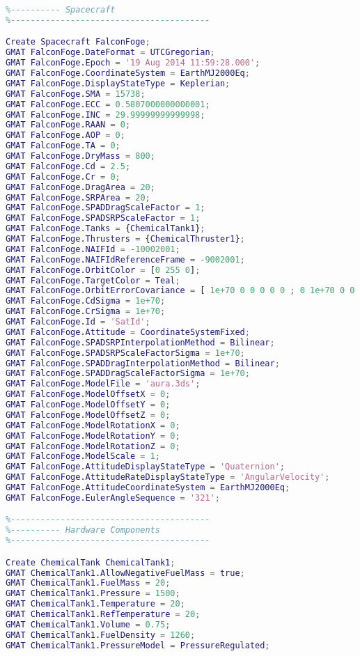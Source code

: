 \begin{lstlisting}[language=MATLAB, caption= Scrit de GMAT]
%----------------------------------------
%---------- Spacecraft
%----------------------------------------

Create Spacecraft FalconFoge;
GMAT FalconFoge.DateFormat = UTCGregorian;
GMAT FalconFoge.Epoch = '19 Aug 2014 11:59:28.000';
GMAT FalconFoge.CoordinateSystem = EarthMJ2000Eq;
GMAT FalconFoge.DisplayStateType = Keplerian;
GMAT FalconFoge.SMA = 15738;
GMAT FalconFoge.ECC = 0.5807000000000001;
GMAT FalconFoge.INC = 29.99999999999998;
GMAT FalconFoge.RAAN = 0;
GMAT FalconFoge.AOP = 0;
GMAT FalconFoge.TA = 0;
GMAT FalconFoge.DryMass = 800;
GMAT FalconFoge.Cd = 2.5;
GMAT FalconFoge.Cr = 0;
GMAT FalconFoge.DragArea = 20;
GMAT FalconFoge.SRPArea = 20;
GMAT FalconFoge.SPADDragScaleFactor = 1;
GMAT FalconFoge.SPADSRPScaleFactor = 1;
GMAT FalconFoge.Tanks = {ChemicalTank1};
GMAT FalconFoge.Thrusters = {ChemicalThruster1};
GMAT FalconFoge.NAIFId = -10002001;
GMAT FalconFoge.NAIFIdReferenceFrame = -9002001;
GMAT FalconFoge.OrbitColor = [0 255 0];
GMAT FalconFoge.TargetColor = Teal;
GMAT FalconFoge.OrbitErrorCovariance = [ 1e+70 0 0 0 0 0 ; 0 1e+70 0 0 0 0 ; 0 0 1e+70 0 0 0 ; 0 0 0 1e+70 0 0 ; 0 0 0 0 1e+70 0 ; 0 0 0 0 0 1e+70 ];
GMAT FalconFoge.CdSigma = 1e+70;
GMAT FalconFoge.CrSigma = 1e+70;
GMAT FalconFoge.Id = 'SatId';
GMAT FalconFoge.Attitude = CoordinateSystemFixed;
GMAT FalconFoge.SPADSRPInterpolationMethod = Bilinear;
GMAT FalconFoge.SPADSRPScaleFactorSigma = 1e+70;
GMAT FalconFoge.SPADDragInterpolationMethod = Bilinear;
GMAT FalconFoge.SPADDragScaleFactorSigma = 1e+70;
GMAT FalconFoge.ModelFile = 'aura.3ds';
GMAT FalconFoge.ModelOffsetX = 0;
GMAT FalconFoge.ModelOffsetY = 0;
GMAT FalconFoge.ModelOffsetZ = 0;
GMAT FalconFoge.ModelRotationX = 0;
GMAT FalconFoge.ModelRotationY = 0;
GMAT FalconFoge.ModelRotationZ = 0;
GMAT FalconFoge.ModelScale = 1;
GMAT FalconFoge.AttitudeDisplayStateType = 'Quaternion';
GMAT FalconFoge.AttitudeRateDisplayStateType = 'AngularVelocity';
GMAT FalconFoge.AttitudeCoordinateSystem = EarthMJ2000Eq;
GMAT FalconFoge.EulerAngleSequence = '321';

%----------------------------------------
%---------- Hardware Components
%----------------------------------------

Create ChemicalTank ChemicalTank1;
GMAT ChemicalTank1.AllowNegativeFuelMass = true;
GMAT ChemicalTank1.FuelMass = 20;
GMAT ChemicalTank1.Pressure = 1500;
GMAT ChemicalTank1.Temperature = 20;
GMAT ChemicalTank1.RefTemperature = 20;
GMAT ChemicalTank1.Volume = 0.75;
GMAT ChemicalTank1.FuelDensity = 1260;
GMAT ChemicalTank1.PressureModel = PressureRegulated;


\end{lstlisting}
